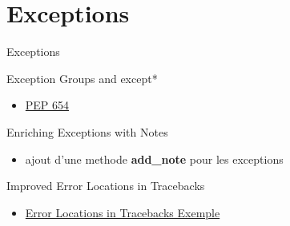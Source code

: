 \documentclass[aspectratio=169, xetex, 12pt]{beamer}
\begin{document}
    \section{Exceptions}
    \begin{frame}{Exceptions}
        \begin{block}{Exception Groups and except*}
            \begin{itemize}
                \item \href{https://peps.python.org/pep-0654/}{PEP 654}
            \end{itemize}
        \end{block}
        \begin{block}{Enriching Exceptions with Notes}
            \begin{itemize}
                \item ajout d'une methode \textbf{add\_note} pour les exceptions
            \end{itemize}
        \end{block}
        \begin{block}{Improved Error Locations in Tracebacks}
            \begin{itemize}
                \item \href{https://docs.python.org/3.11/whatsnew/3.11.html\#enhanced-error-locations-in-tracebacks}{Error Locations in Tracebacks Exemple}
            \end{itemize}
        \end{block}
    \end{frame}
\end{document}
